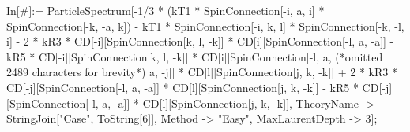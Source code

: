 In[\#]:= ParticleSpectrum[-1/3 * (kT1 * SpinConnection[-i, a, i] * SpinConnection[-k, -a, k]) - kT1 * SpinConnection[-i, k, l] * SpinConnection[-k, -l, i] - 2 * kR3 * CD[-i][SpinConnection[k, l, -k]] * CD[i][SpinConnection[-l, a, -a]] - kR5 * CD[-i][SpinConnection[k, l, -k]] * CD[i][SpinConnection[-l, a, (*omitted 2489 characters for brevity*) a, -j]] * CD[l][SpinConnection[j, k, -k]] + 2 * kR3 * CD[-j][SpinConnection[-l, a, -a]] * CD[l][SpinConnection[j, k, -k]] - kR5 * CD[-j][SpinConnection[-l, a, -a]] * CD[l][SpinConnection[j, k, -k]], TheoryName -> StringJoin["Case", ToString[6]], Method -> "Easy", MaxLaurentDepth -> 3];